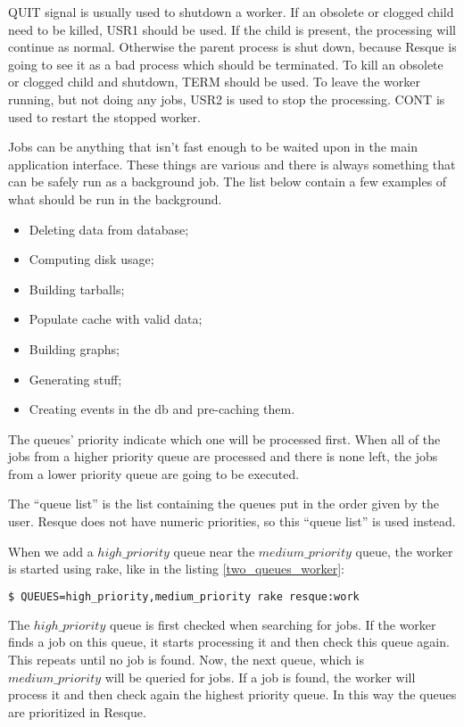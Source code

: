 QUIT signal is usually used to shutdown a worker.
If an obsolete or clogged child need to be killed, USR1 should be used. If the child is present, the processing will continue as normal. Otherwise the parent process is shut down, because Resque is going to see it as a bad process which should be terminated.
To kill an obsolete or clogged child and shutdown, TERM should be used.
To leave the worker running, but not doing any jobs, USR2 is used to stop the processing. CONT is used to restart the stopped worker.

Jobs can be anything that isn't fast enough to be waited upon in the main application interface. These things are various and there is always something that can be safely run as a background job. The list below contain a few examples of what should be run in the background.
\begin{itemize}
  \item Deleting data from database;
  \item Computing disk usage;
  \item Building tarballs;
  \item Populate cache with valid data;
  \item Building graphs;
  \item Generating stuff;
  \item Creating events in the db and pre-caching them.
\end{itemize}

The queues' priority indicate which one will be processed first. When all of the jobs from a higher priority queue are processed and there is none left, the jobs from a lower priority queue are going to be executed.

The ``queue list'' is the list containing the queues put in the order given by the user. Resque does not have numeric priorities, so this ``queue list'' is used instead. 

When we add a $high\_priority$ queue near the $medium\_priority$ queue, the worker is started using rake, like in the listing \ref{two_queues_worker}:
\begin{lstlisting}[language=Bash, caption={Working on two queues}, label=two_queues_worker]
$ QUEUES=high_priority,medium_priority rake resque:work
\end{lstlisting}

The $high\_priority$ queue is first checked when searching for jobs. If the worker finds a job on this queue, it starts processing it and then check this queue again. This repeats until no job is found. Now, the next queue, which is $medium\_priority$ will be queried for jobs. If a job is found, the worker will process it and then check again the highest priority queue. In this way the queues are prioritized in Resque.


\clearpage

